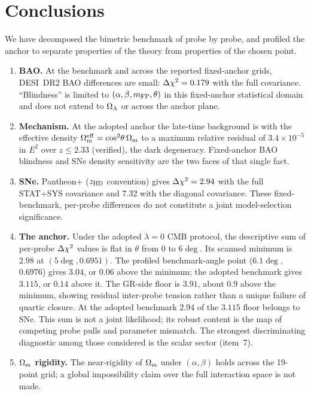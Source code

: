 \section{Conclusions}\label{sec:conclusions}

We have decomposed the bimetric benchmark of \citet{Hogas2025} probe by probe, and profiled the anchor to separate properties of the theory from properties of the chosen point.

\begin{enumerate}
\item \textbf{BAO.} At the benchmark and across the reported fixed-anchor grids, DESI~DR2 BAO differences are small: $\Delta\chi^2=0.179$ with the full covariance. ``Blindness'' is limited to $(\alpha,\beta,m_{\mathrm{FP}},\theta)$ in this fixed-anchor statistical domain and does not extend to $\Omega_{\Lambda}$ or across the anchor plane.
\item \textbf{Mechanism.} At the adopted anchor the late-time background is \LCDM{} with the effective density $\Omega_{\mathrm m}^{\rm eff}=\cos^2\!\theta\,\Omega_{\mathrm m}$ to a maximum relative residual of $3.4\times10^{-5}$ in $E^2$ over $z\le2.33$ (verified), the dark degeneracy. Fixed-anchor BAO blindness and SNe density sensitivity are the two faces of that single fact.
\item \textbf{SNe.} Pantheon+ ($z_{\rm HD}$ convention) gives $\Delta\chi^2=2.94$ with the full STAT+SYS covariance and $7.32$ with the diagonal covariance. These fixed-benchmark, per-probe differences do not constitute a joint model-selection significance.
\item \textbf{The anchor.} Under the adopted $\lambda=0$ CMB protocol, the descriptive sum of per-probe $\Delta\chi^2$ values is flat in $\theta$ from $0$ to $6\deg$. Its scanned minimum is $2.98$ at $(5\deg,0.6951)$. The profiled benchmark-angle point ($6.1\deg$, $0.6976$) gives $3.04$, or $0.06$ above the minimum; the adopted benchmark gives $3.115$, or $0.14$ above it. The GR-side floor is $3.91$, about $0.9$ above the minimum, showing residual inter-probe tension rather than a unique failure of quartic closure. At the adopted benchmark $2.94$ of the $3.115$ floor belongs to SNe. This sum is not a joint likelihood; its robust content is the map of competing probe pulls and parameter mismatch. The strongest discriminating diagnostic among those considered is the scalar sector (item~7).
\item \textbf{$\Omega_{\mathrm m}$ rigidity.} The near-rigidity of $\Omega_{\mathrm m}$ under $(\alpha,\beta)$ holds across the 19-point grid; a global impossibility claim over the full interaction space is not made.

\end{enumerate}
